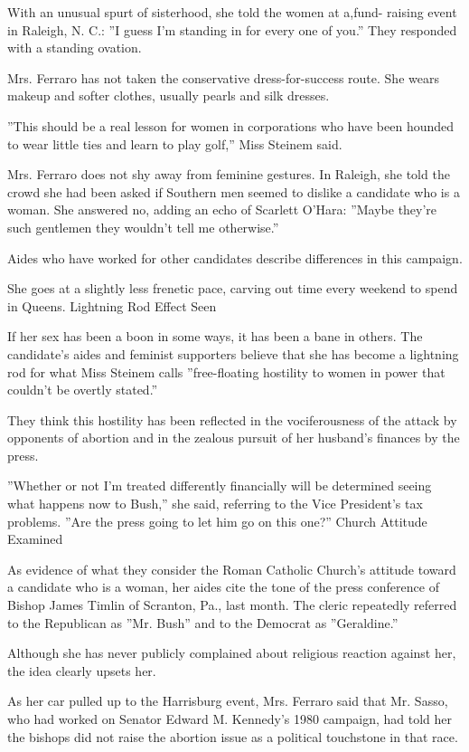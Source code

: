 With an unusual spurt of sisterhood, she told the women at a,fund-
raising event in Raleigh, N. C.: ''I guess I'm standing in for every one
of you.'' They responded with a standing ovation.

Mrs. Ferraro has not taken the conservative dress-for-success route. She
wears makeup and softer clothes, usually pearls and silk dresses.

''This should be a real lesson for women in corporations who have been
hounded to wear little ties and learn to play golf,'' Miss Steinem said.

Mrs. Ferraro does not shy away from feminine gestures. In Raleigh, she
told the crowd she had been asked if Southern men seemed to dislike a
candidate who is a woman. She answered no, adding an echo of Scarlett
O'Hara: ''Maybe they're such gentlemen they wouldn't tell me
otherwise.''

Aides who have worked for other candidates describe differences in this
campaign.

She goes at a slightly less frenetic pace, carving out time every
weekend to spend in Queens. Lightning Rod Effect Seen

If her sex has been a boon in some ways, it has been a bane in others.
The candidate's aides and feminist supporters believe that she has
become a lightning rod for what Miss Steinem calls ''free-floating
hostility to women in power that couldn't be overtly stated.''

They think this hostility has been reflected in the vociferousness of
the attack by opponents of abortion and in the zealous pursuit of her
husband's finances by the press.

''Whether or not I'm treated differently financially will be determined
seeing what happens now to Bush,'' she said, referring to the Vice
President's tax problems. ''Are the press going to let him go on this
one?'' Church Attitude Examined

As evidence of what they consider the Roman Catholic Church's attitude
toward a candidate who is a woman, her aides cite the tone of the press
conference of Bishop James Timlin of Scranton, Pa., last month. The
cleric repeatedly referred to the Republican as ''Mr. Bush'' and to the
Democrat as ''Geraldine.''

Although she has never publicly complained about religious reaction
against her, the idea clearly upsets her.

As her car pulled up to the Harrisburg event, Mrs. Ferraro said that Mr.
Sasso, who had worked on Senator Edward M. Kennedy's 1980 campaign, had
told her the bishops did not raise the abortion issue as a political
touchstone in that race.

